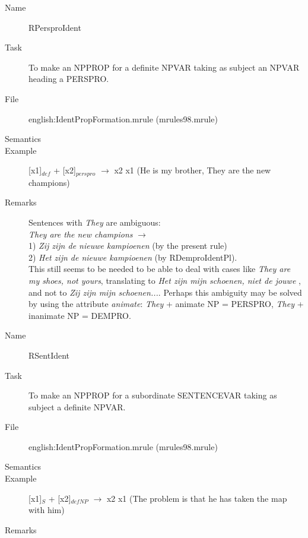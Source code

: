 \begin{description}
\vspace{1 cm}
\begin{description}
\item[Name] RPersproIdent
\item[Task] To make an NPPROP for a definite NPVAR taking as subject 
an NPVAR heading a PERSPRO. 
\item[File] english:IdentPropFormation.mrule (mrules98.mrule)
\item[Semantics]
\item[Example] [x1]$_{def}$ + [x2]$_{perspro}$ $\rightarrow$ x2 x1 (He is my 
brother, They are the new champions)
\item[Remarks] Sentences with {\em They\/} are ambiguous: \\
{\em They are the new champions\/} $\rightarrow$ \\
1) {\em Zij zijn de nieuwe kampioenen\/} (by the present rule)\\
2) {\em Het zijn de nieuwe kampioenen\/} (by RDemproIdentPl).\\
This still seems to be needed to be able to deal with cases like {\em They are 
my
shoes, not yours\/}, translating to {\em Het zijn mijn schoenen, niet de jouwe 
}, and not to {\em Zij zijn mijn schoenen...\/}. Perhaps this ambiguity may be 
solved by using the attribute {\em animate\/}: {\em They\/} + animate NP = 
PERSPRO, {\em They\/} + inanimate NP = DEMPRO.
\end{description}

\vspace{1 cm}
\begin{description}
\item[Name] RSentIdent
\item[Task] To make an NPPROP for a subordinate SENTENCEVAR taking as subject 
a definite NPVAR.
\item[File] english:IdentPropFormation.mrule (mrules98.mrule)
\item[Semantics]
\item[Example] [x1]$_{S}$ + [x2]$_{defNP}$ $\rightarrow$ x2 x1 (The problem is 
that he has taken the map with him)
\item[Remarks] 
\end{description}

\end{description}

\newpage
